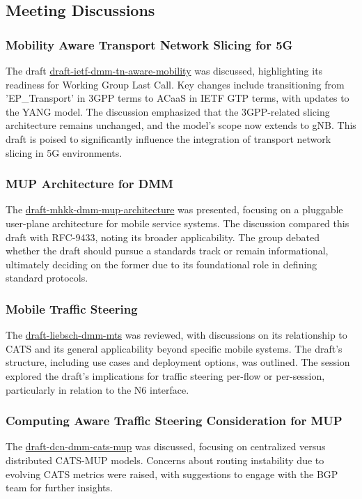 \documentclass{article}
\begin{document}
\subsection{Meeting Discussions}

\subsubsection{Mobility Aware Transport Network Slicing for 5G}
The draft \href{https://datatracker.ietf.org/doc/draft-ietf-dmm-tn-aware-mobility}{draft-ietf-dmm-tn-aware-mobility} was discussed, highlighting its readiness for Working Group Last Call. Key changes include transitioning from 'EP\_Transport' in 3GPP terms to ACaaS in IETF GTP terms, with updates to the YANG model. The discussion emphasized that the 3GPP-related slicing architecture remains unchanged, and the model's scope now extends to gNB. This draft is poised to significantly influence the integration of transport network slicing in 5G environments.

\subsubsection{MUP Architecture for DMM}
The \href{https://datatracker.ietf.org/doc/draft-mhkk-dmm-mup-architecture}{draft-mhkk-dmm-mup-architecture} was presented, focusing on a pluggable user-plane architecture for mobile service systems. The discussion compared this draft with RFC-9433, noting its broader applicability. The group debated whether the draft should pursue a standards track or remain informational, ultimately deciding on the former due to its foundational role in defining standard protocols.

\subsubsection{Mobile Traffic Steering}
The \href{https://datatracker.ietf.org/doc/draft-liebsch-dmm-mts}{draft-liebsch-dmm-mts} was reviewed, with discussions on its relationship to CATS and its general applicability beyond specific mobile systems. The draft's structure, including use cases and deployment options, was outlined. The session explored the draft's implications for traffic steering per-flow or per-session, particularly in relation to the N6 interface.

\subsubsection{Computing Aware Traffic Steering Consideration for MUP}
The \href{https://datatracker.ietf.org/doc/html/draft-dcn-dmm-cats-mup}{draft-dcn-dmm-cats-mup} was discussed, focusing on centralized versus distributed CATS-MUP models. Concerns about routing instability due to evolving CATS metrics were raised, with suggestions to engage with the BGP team for further insights.
\end{document}
